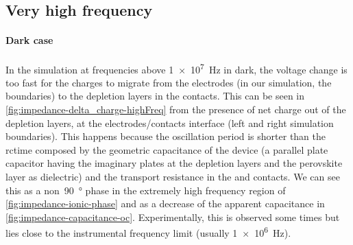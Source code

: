 	\begin{figure}%
	\end{figure}



	\subsection{Very high frequency}
	\paragraph{Dark case}
In the simulation at frequencies above \SI{1e7}{\Hz} in dark, the voltage change is too fast for the charges to migrate from the electrodes (in our simulation, the boundaries) to the depletion layers in the contacts.
This can be seen in \cref{fig:impedance-delta_charge-highFreq} from the presence of net charge out of the depletion layers, at the electrodes\-/contacts interface (left and right simulation boundaries).
This happens because the oscillation period is shorter than the \gls{rctime} composed by the geometric capacitance of the device (a parallel plate capacitor having the imaginary plates at the depletion layers and the perovskite layer as dielectric) and the transport resistance in the  and  contacts.
We can see this as a non~\SI{90}{\degree} phase in the extremely high frequency region of \cref{fig:impedance-ionic-phase} and as a decrease of the apparent capacitance in \cref{fig:impedance-capacitance-oc}.
Experimentally, this is observed some times but lies close to the instrumental frequency limit (usually \SI{1e6}{\Hz}).


